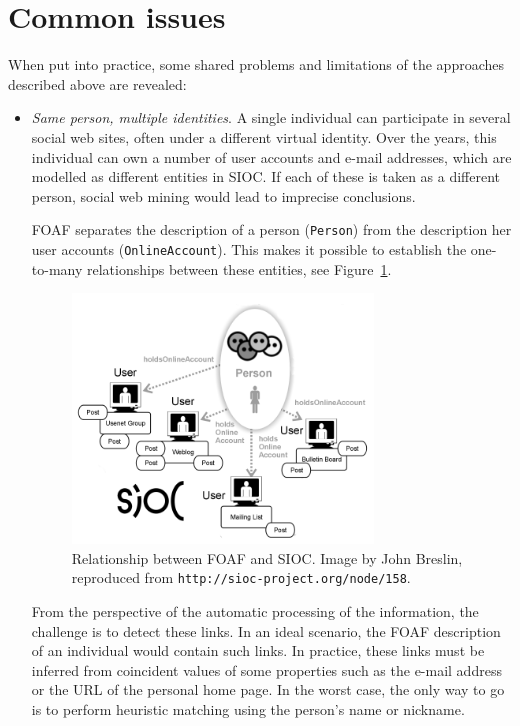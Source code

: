 \documentclass{../templates/www2008-submission}
\begin{document}
\section{\label{sec:problems}Common issues}

When put into practice, some shared problems and limitations
of the approaches described above are revealed:

\begin{itemize}
  \item \emph{Same person, multiple identities}. A single individual can
        participate in several social web sites, often under a different
        virtual identity. Over the years, this individual can own a
        number of user accounts and e-mail addresses, which are modelled
        as different entities in SIOC. If each of these is taken as
        a different person, social web mining would lead to imprecise
        conclusions.

        FOAF separates the description of a person
        (\texttt{Person})
        from the description her user accounts (\texttt{OnlineAccount}).
        This makes it possible to establish the one-to-many relationships
        between these entities, see Figure~\ref{fig:foaf-sioc}.

	\begin{figure}[t]
	 \centering
	 \includegraphics[width=8cm]{images/foaf-sioc.png}
	 \caption{\label{fig:foaf-sioc}Relationship between FOAF and SIOC. Image by John Breslin, reproduced from \texttt{http://sioc-project.org/node/158}.}
	\end{figure}

        From the perspective of the automatic processing of the
        information, the challenge is to detect these links. In an
        ideal scenario, the FOAF description of an individual would
        contain such links. In practice, these links must be
        inferred from coincident values of some properties such
        as the e-mail address or the URL of the personal home page.
        In the worst case, the only way to go is to perform heuristic matching
        using the person's name or nickname.


\end{itemize}
\end{document}
